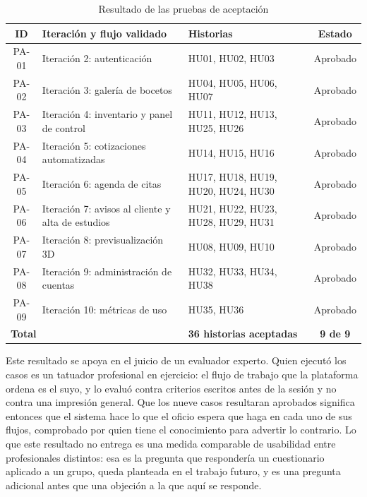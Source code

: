 \documentclass[12pt,letterpaper,oneside]{report}
\begin{document}
\begin{table}[H]
  \centering
  \caption{Resultado de las pruebas de aceptación}
  \label{tab:resumenaceptacion}
  \renewcommand{\arraystretch}{1.2}
  \footnotesize
  \begin{tabular}{|c|>{\raggedright\arraybackslash}p{5.0cm}|>{\raggedright\arraybackslash}p{4.5cm}|c|}
    \hline
    \textbf{ID} & \textbf{Iteración y flujo validado} & \textbf{Historias} & \textbf{Estado} \\
    \hline
    PA-01 & Iteración 2: autenticación & HU01, HU02, HU03 & Aprobado \\ \hline
    PA-02 & Iteración 3: galería de bocetos & HU04, HU05, HU06, HU07 & Aprobado \\ \hline
    PA-03 & Iteración 4: inventario y panel de control & HU11, HU12, HU13, HU25, HU26 & Aprobado \\ \hline
    PA-04 & Iteración 5: cotizaciones automatizadas & HU14, HU15, HU16 & Aprobado \\ \hline
    PA-05 & Iteración 6: agenda de citas & HU17, HU18, HU19, HU20, HU24, HU30 & Aprobado \\ \hline
    PA-06 & Iteración 7: avisos al cliente y alta de estudios & HU21, HU22, HU23, HU28, HU29, HU31 & Aprobado \\ \hline
    PA-07 & Iteración 8: previsualización 3D & HU08, HU09, HU10 & Aprobado \\ \hline
    PA-08 & Iteración 9: administración de cuentas & HU32, HU33, HU34, HU38 & Aprobado \\ \hline
    PA-09 & Iteración 10: métricas de uso & HU35, HU36 & Aprobado \\ \hline
    \multicolumn{2}{|l|}{\textbf{Total}} & \textbf{36 historias aceptadas} & \textbf{9 de 9} \\ \hline
  \end{tabular}
\end{table}

Este resultado se apoya en el juicio de un evaluador experto. Quien ejecutó los casos es un tatuador profesional en ejercicio: el flujo de trabajo que la plataforma ordena es el suyo, y lo evaluó contra criterios escritos antes de la sesión y no contra una impresión general. Que los nueve casos resultaran aprobados significa entonces que el sistema hace lo que el oficio espera que haga en cada uno de sus flujos, comprobado por quien tiene el conocimiento para advertir lo contrario. Lo que este resultado no entrega es una medida comparable de usabilidad entre profesionales distintos: esa es la pregunta que respondería un cuestionario aplicado a un grupo, queda planteada en el trabajo futuro, y es una pregunta adicional antes que una objeción a la que aquí se responde.
\end{document}
